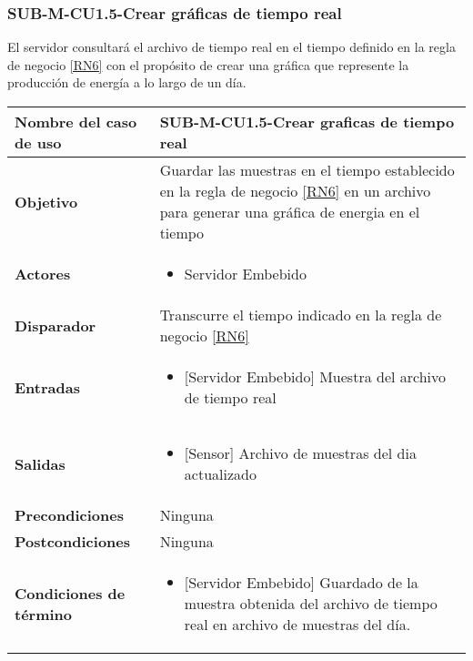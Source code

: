 \subsubsection{SUB-M-CU1.5-Crear gráficas de tiempo real}\label{SUB-M-CU1.5}
El servidor consultará el archivo de tiempo real en el tiempo definido en la regla de negocio \ref{RN6} con el propósito de crear una gráfica que represente la producción de energía a lo largo de un día.
\begin{longtable}{|J{5cm}|J{10.3cm}|}
	\hline
	\textbf{Nombre del caso de uso} &
		SUB-M-CU1.5-Crear graficas de tiempo real \\ \hline
	\textbf{Objetivo} &
		Guardar las muestras en el tiempo establecido en la regla de negocio \ref{RN6} en un archivo para generar una gráfica de energia en el tiempo \\ \hline
	\textbf{Actores} &
	    \begin{itemize}
		    \item Servidor Embebido
		\end{itemize}\\ \hline 
	\textbf{Disparador} & 
		Transcurre el tiempo indicado en la regla de negocio \ref{RN6} \\ \hline 
	\textbf{Entradas} & 
		\begin{itemize}
				\item {[Servidor Embebido]} Muestra del archivo de tiempo real
		\end{itemize}\\ \hline 
	\textbf{Salidas} & 
	    \begin{itemize}
	        \item {[Sensor]} Archivo de muestras del dia actualizado
	    \end{itemize}\\ \hline
	\textbf{Precondiciones} & 
		Ninguna \\ \hline
	\textbf{Postcondiciones} &
		Ninguna \\ \hline
	\textbf{Condiciones de término} & 
		\begin{itemize}
		    \item {[Servidor Embebido]} Guardado de la muestra obtenida del archivo de tiempo real en archivo de muestras del día.
		\end{itemize} 
		\\ \hline 

\end{longtable}
